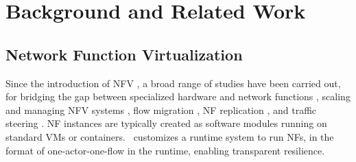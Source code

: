 \section{Background and Related Work}
\label{sec:relatedwork}



\subsection{Network Function Virtualization}

Since the introduction of NFV \cite{nfv_whitepaper}, %
 a broad range of studies have been carried out, for bridging the gap between specialized hardware and network functions \cite{hwang2015netvm, Han:EECS-2015-155, martins2014clickos, 199352}, scaling and managing NFV systems \cite{gember2012stratos, palkar2015e2}, flow migration \cite{rajagopalan2013split, khalid2016paving, gember2015opennf}, NF replication \cite{rajagopalan2013pico, sherry2015rollback}, and traffic steering \cite{simplifying}. %
NF instances are typically created as software modules running on standard VMs or containers. \nfactor~customizes a runtime system to run NFs, in the format of one-actor-one-flow in the runtime, enabling transparent resilience. %



